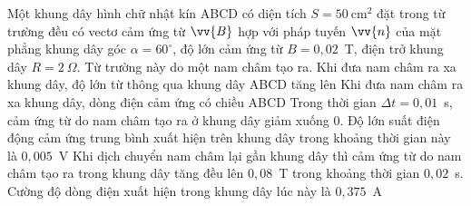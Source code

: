 	\begin{ex}%
		Một khung dây hình chữ nhật kín ABCD có diện tích $S=50~\text{cm}^2$ đặt trong từ trường đều có vectơ cảm ứng từ $\vv{B}$ hợp với pháp tuyến $\vv{n}$ của mặt phẳng khung dây góc $\alpha=60^\circ$, độ lớn cảm ứng từ $B=0{,}02$~T, điện trở khung dây $R=2~\Omega$. Từ trường này do một nam châm tạo ra.
		\choiceTFt
		{Khi đưa nam châm ra xa khung dây, độ lớn từ thông qua khung dây ABCD tăng lên}
		{Khi đưa nam châm ra xa khung dây, dòng điện cảm ứng có chiều ABCD}
		{\True Trong thời gian $\Delta t=0{,}01$~s, cảm ứng từ do nam châm tạo ra ở khung dây giảm xuống $0$. Độ lớn suất điện động cảm ứng trung bình xuất hiện trên khung dây trong khoảng thời gian này là $0{,}005$~V}
		{Khi dịch chuyển nam châm lại gần khung dây thì cảm ứng từ do nam châm tạo ra trong khung dây tăng đều lên $0{,}08$~T trong khoảng thời gian $0{,}02$~s. Cường độ dòng điện xuất hiện trong khung dây lúc này là $0{,}375$~A}
	\end{ex}

